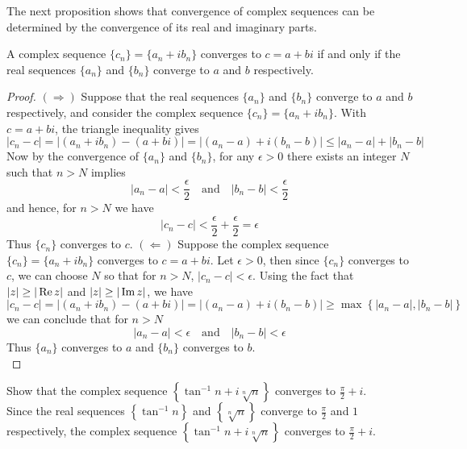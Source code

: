 \documentclass[handout]{ximera}
\begin{document}
The next proposition shows that convergence of complex sequences can be determined by the convergence of its real and imaginary parts.

\begin{proposition}
A complex sequence $\{c_n\} = \{a_n + ib_n\}$ converges to $c = a+bi$ if and only if the real 
sequences $\{a_n\}$ and $\{b_n\}$ converge to $a$ and $b$ respectively.
\end{proposition}
\begin{proof}
$\left(\Rightarrow\right)$ Suppose that the real sequences $\{a_n\}$ and $\{b_n\}$ converge to $a$ and $b$ respectively, 
and consider the complex sequence $\{c_n\} = \{a_n + ib_n\}$. With $c = a+bi$, the triangle inequality gives
\[
|c_n - c| = |(a_n + ib_n) - (a+bi)| = |(a_n -a) + i(b_n -b)| \leq |a_n-a|+ |b_n -b|
\]
Now by the convergence of $\{a_n\}$ and $\{b_n\}$, for any $\epsilon >0$ there exists an integer $N$ such that $n>N$ implies
\[
|a_n-a| < \frac{\epsilon}{2} \quad \text{and} \quad  |b_n -b| < \frac{\epsilon}{2}
\]
and hence, for $n>N$ we have
\[
|c_n-c| < \frac{\epsilon}{2}+\frac{\epsilon}{2}= \epsilon 
\]
Thus $\{c_n\}$ converges to $c$.
$\left(\Leftarrow\right)$ \; Suppose the complex sequence $\{c_n\} = \{a_n + ib_n\}$ converges to $c = a+bi$.
Let $\epsilon >0$, then since $\{c_n\}$ converges to $c$, we can choose $N$ so that for $n>N$, $|c_n - c| < \epsilon$.
Using the fact that $|z| \geq |\operatorname{Re} z|$ and $|z| \geq |\operatorname{Im} z|$, we have 
\[
|c_n - c| = |(a_n + ib_n) - (a+bi)| = |(a_n -a) + i(b_n -b)| \geq \max\left\{|a_n-a|, |b_n -b|\right\}
\]
we can conclude that for $n>N$
\[
|a_n-a| < \epsilon \quad \text{and} \quad  |b_n -b| < \epsilon
\]
Thus $\{a_n\}$ converges to $a$ and $\{b_n\}$ converges to $b$.\\

\end{proof}

\begin{example}
Show that the complex sequence $\displaystyle \left\{\tan^{-1} n + i\sqrt[n]n\right\}$ converges to $\displaystyle \frac{\pi}{2} + i$.\\
Since the real sequences $\displaystyle \left\{\tan^{-1} n\right\}$ and $\displaystyle \left\{\sqrt[n]n\right\}$ converge to 
$\displaystyle \frac{\pi}{2}$ and $1$ respectively, the complex sequence 
$\displaystyle \left\{\tan^{-1} n + i\sqrt[n]n\right\}$ converges to $\displaystyle \frac{\pi}{2} + i$.
\end{example}
\end{document}
